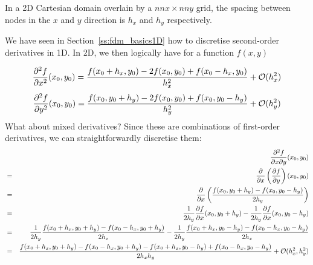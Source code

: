 
In a 2D Cartesian domain overlain by a $nnx \times nny$ grid, 
the spacing between nodes in the $x$ and $y$ direction is $h_x$ 
and $h_y$ respectively. 

\begin{center}

\end{center}

We have seen in Section~\ref{ss:fdm_basics1D} how to discretise second-order derivatives in 1D. 
In 2D, we then logically have for a function $f(x,y)$

\begin{equation}
\frac{\partial^2 f}{\partial x^2}(x_0,y_0) = \frac{f(x_0+h_x,y_0) -2f(x_0,y_0) + f(x_0-h_x,y_0) }{h_x^2} 
+ {\cal O}(h_x^2)
\end{equation}
\begin{equation}
\frac{\partial^2 f}{\partial y^2}(x_0,y_0) = \frac{f(x_0,y_0+h_y) -2f(x_0,y_0) + f(x_0,y_0-h_y) }{h_y^2} 
+ {\cal O}(h_y^2)
\end{equation}
What about mixed derivatives? Since these are combinations of first-order derivatives, 
we can straightforwardly discretise them:
\begin{eqnarray}
&& \frac{\partial^2 f }{\partial x \partial y}(x_0,y_0) \nonumber\\
&=& \frac{\partial }{\partial x} \left(\frac{\partial f}{\partial y}\right) (x_0,y_0) \nonumber\\
&=& \frac{\partial }{\partial x} \left(\frac{ f(x_0,y_0+h_y)-f(x_0,y_0-h_y)}{2h_y} \right) \nonumber\\
&=& \frac{1}{2h_y} \frac{\partial f}{\partial x} (x_0,y_0+h_y)
   -\frac{1}{2h_y} \frac{\partial f}{\partial x} (x_0,y_0-h_y) \nonumber\\
&=& \frac{1}{2h_y}  \frac{ f(x_0+h_x,y_0+h_y)-f(x_0-h_x,y_0+h_y)}{2h_x} 
-   \frac{1}{2h_y}  \frac{ f(x_0+h_x,y_0-h_y)-f(x_0-h_x,y_0-h_y)}{2h_x}  \nonumber\\
&=& \frac{f(x_0+h_x,y_0+h_y)-f(x_0-h_x,y_0+h_y)-f(x_0+h_x,y_0-h_y)+f(x_0-h_x,y_0-h_y)}{2 h_x h_y}
+ {\cal O}(h_x^2,h_y^2) \nonumber
\end{eqnarray}
